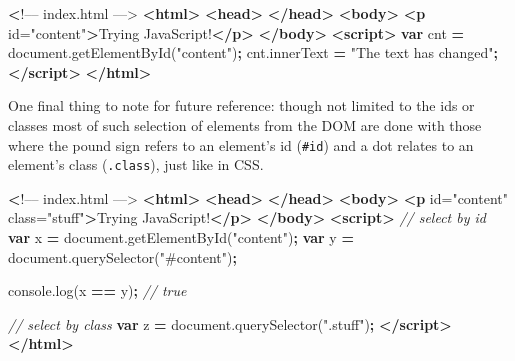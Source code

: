 \documentclass[10pt,]{krantz}
\makeatletter
\newenvironment{Shaded}{\begin{snugshade}}{\end{snugshade}}
\newcommand{\AttributeTok}[1]{\textcolor[rgb]{0.61,0.61,0.61}{#1}}
\newcommand{\CommentTok}[1]{\textcolor[rgb]{0.37,0.37,0.37}{\textit{#1}}}
\newcommand{\ErrorTok}[1]{\textcolor[rgb]{0.14,0.14,0.14}{\textbf{#1}}}
\newcommand{\KeywordTok}[1]{\textcolor[rgb]{0.27,0.27,0.27}{\textbf{#1}}}
\newcommand{\NormalTok}[1]{#1}
\newcommand{\OperatorTok}[1]{\textcolor[rgb]{0.43,0.43,0.43}{\textbf{#1}}}
\newcommand{\OtherTok}[1]{\textcolor[rgb]{0.37,0.37,0.37}{#1}}
\newcommand{\StringTok}[1]{\textcolor[rgb]{0.5,0.5,0.5}{#1}}
\newcommand{\VariableTok}[1]{\textcolor[rgb]{0,0,0}{#1}}
\newenvironment{kframe}{%
\medskip{}
\setlength{\fboxsep}{.8em}
 \def\at@end@of@kframe{}%
 \ifinner\ifhmode%
  \def\at@end@of@kframe{\end{minipage}}%
  \begin{minipage}{\columnwidth}%
 \fi\fi%
 \def\FrameCommand##1{\hskip\@totalleftmargin \hskip-\fboxsep
 \colorbox{shadecolor}{##1}\hskip-\fboxsep
     \hskip-\linewidth \hskip-\@totalleftmargin \hskip\columnwidth}%
 \MakeFramed {\advance\hsize-\width
   \@totalleftmargin\z@ \linewidth\hsize
   \@setminipage}}%
 {\par\unskip\endMakeFramed%
 \at@end@of@kframe}
\renewenvironment{Shaded}{\begin{kframe}}{\end{kframe}}
\makeatother
\begin{document}
\begin{Shaded}
\begin{Highlighting}[]
 \ErrorTok{<}\NormalTok{!–– index.html ––>}
\KeywordTok{<html>}
  \KeywordTok{<head>}
  \KeywordTok{</head>}
  \KeywordTok{<body>}
    \KeywordTok{<p}\OtherTok{ id=}\StringTok{"content"}\KeywordTok{>}\NormalTok{Trying JavaScript!}\KeywordTok{</p>}
  \KeywordTok{</body>}
  \KeywordTok{<script>}
    \KeywordTok{var}\NormalTok{ cnt }\OperatorTok{=} \VariableTok{document}\NormalTok{.}\AttributeTok{getElementById}\NormalTok{(}\StringTok{"content"}\NormalTok{)}\OperatorTok{;}
    \VariableTok{cnt}\NormalTok{.}\AttributeTok{innerText} \OperatorTok{=} \StringTok{"The text has changed"}\OperatorTok{;}
  \KeywordTok{</script>}
\KeywordTok{</html>}
\end{Highlighting}
\end{Shaded}

One final thing to note for future reference: though not limited to the ids or classes most of such selection of elements from the DOM are done with those where the pound sign refers to an element's id (\texttt{\#id}) and a dot relates to an element's class (\texttt{.class}), just like in CSS.

\begin{Shaded}
\begin{Highlighting}[]
 \ErrorTok{<}\NormalTok{!–– index.html ––>}
\KeywordTok{<html>}
  \KeywordTok{<head>}
  \KeywordTok{</head>}
  \KeywordTok{<body>}
    \KeywordTok{<p}\OtherTok{ id=}\StringTok{"content"}\OtherTok{ class=}\StringTok{"stuff"}\KeywordTok{>}\NormalTok{Trying JavaScript!}\KeywordTok{</p>}
  \KeywordTok{</body>}
  \KeywordTok{<script>}
    \CommentTok{// select by id}
    \KeywordTok{var}\NormalTok{ x }\OperatorTok{=} \VariableTok{document}\NormalTok{.}\AttributeTok{getElementById}\NormalTok{(}\StringTok{"content"}\NormalTok{)}\OperatorTok{;}
    \KeywordTok{var}\NormalTok{ y }\OperatorTok{=} \VariableTok{document}\NormalTok{.}\AttributeTok{querySelector}\NormalTok{(}\StringTok{"#content"}\NormalTok{)}\OperatorTok{;}

    \VariableTok{console}\NormalTok{.}\AttributeTok{log}\NormalTok{(x }\OperatorTok{==}\NormalTok{ y)}\OperatorTok{;} \CommentTok{// true}

    \CommentTok{// select by class}
    \KeywordTok{var}\NormalTok{ z }\OperatorTok{=} \VariableTok{document}\NormalTok{.}\AttributeTok{querySelector}\NormalTok{(}\StringTok{".stuff"}\NormalTok{)}\OperatorTok{;}
  \KeywordTok{</script>}
\KeywordTok{</html>}
\end{Highlighting}
\end{Shaded}
\end{document}
